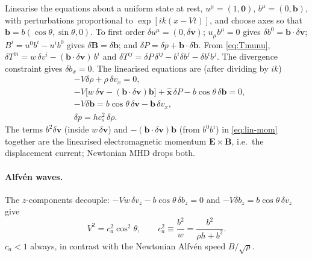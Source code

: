 \documentclass[11pt,a4paper,oneside,openany]{book}
\theoremstyle{definition}
\theoremstyle{plain}
\theoremstyle{remark}
\newcommand{\vv}{\bm{v}}
\newcommand{\BB}{\bm{B}}
\newcommand{\EE}{\bm{E}}
\newcommand{\Ptot}{P}
\begin{document}
Linearise the equations about a uniform state at rest, $u^\mu=(1,\bm0)$, $b^\mu=(0,\bm b)$,
with perturbations proportional to $\exp[ik(x-Vt)]$, and choose axes so that
$\bm b=b(\cos\theta,\sin\theta,0)$. To first order $\delta u^\mu=(0,\delta\vv)$;
$u_\mu b^\mu=0$ gives $\delta b^0=\bm b\cdot\delta\vv$; $B^i=u^0b^i-u^ib^0$ gives
$\delta\BB=\delta\bm b$; and $\delta\Ptot=\delta p+\bm b\cdot\delta\bm b$. From
\eqref{eq:Tmunu}, $\delta T^{0i}=w\,\delta v^i-(\bm b\cdot\delta\vv)\,b^i$ and
$\delta T^{ij}=\delta\Ptot\,\delta^{ij}-b^i\delta b^j-\delta b^ib^j$. The divergence
constraint gives $\delta b_x=0$. The linearised equations are (after dividing by $ik$)
\begin{align}
&-V\delta\rho+\rho\,\delta v_x=0, \label{eq:lin-mass}\\
&-V\bigl[w\,\delta\vv-(\bm b\cdot\delta\vv)\bm b\bigr]+\hat{\bm x}\,\delta\Ptot-b\cos\theta\,\delta\bm b=0,
  \label{eq:lin-mom}\\
&-V\delta\bm b=b\cos\theta\,\delta\vv-\bm b\,\delta v_x, \label{eq:lin-ind}\\
&\delta p=hc_s^2\,\delta\rho . \label{eq:lin-ent}
\end{align}
The terms $b^2\delta\vv$ (inside $w\,\delta\vv$) and $-(\bm b\cdot\delta\vv)\bm b$ (from
$b^0b^i$) in \eqref{eq:lin-mom} together are the linearised electromagnetic momentum
$\EE\times\BB$, i.e.\ the displacement current; Newtonian MHD drops both.

\paragraph{Alfvén waves.} The $z$-components decouple: $-Vw\,\delta v_z-b\cos\theta\,
\delta b_z=0$ and $-V\delta b_z=b\cos\theta\,\delta v_z$ give
\begin{equation}\label{eq:alfven-rest}
V^2=c_a^2\cos^2\theta,\qquad c_a^2\equiv\frac{b^2}{w}=\frac{b^2}{\rho h+b^2}.
\end{equation}
$c_a<1$ always, in contrast with the Newtonian Alfvén speed $B/\sqrt\rho$.
\end{document}
